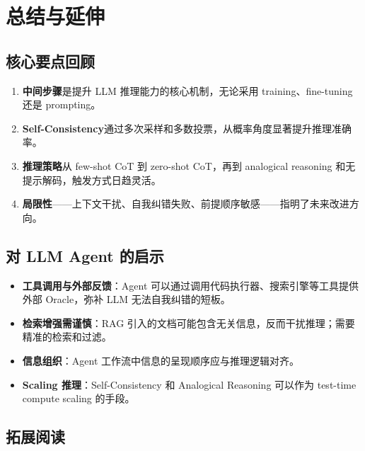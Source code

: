 \section{总结与延伸}

\subsection{核心要点回顾}

\begin{enumerate}
    \item \textbf{中间步骤}是提升 LLM 推理能力的核心机制，无论采用 training、fine-tuning 还是 prompting。
    \item \textbf{Self-Consistency}通过多次采样和多数投票，从概率角度显著提升推理准确率。
    \item \textbf{推理策略}从 few-shot CoT 到 zero-shot CoT，再到 analogical reasoning 和无提示解码，触发方式日趋灵活。
    \item \textbf{局限性}——上下文干扰、自我纠错失败、前提顺序敏感——指明了未来改进方向。
\end{enumerate}

\subsection{对 LLM Agent 的启示}

\begin{itemize}
    \item \textbf{工具调用与外部反馈}：Agent 可以通过调用代码执行器、搜索引擎等工具提供外部 Oracle，弥补 LLM 无法自我纠错的短板。
    \item \textbf{检索增强需谨慎}：RAG 引入的文档可能包含无关信息，反而干扰推理；需要精准的检索和过滤。
    \item \textbf{信息组织}：Agent 工作流中信息的呈现顺序应与推理逻辑对齐。
    \item \textbf{Scaling 推理}：Self-Consistency 和 Analogical Reasoning 可以作为 test-time compute scaling 的手段。
\end{itemize}

\subsection{拓展阅读}

